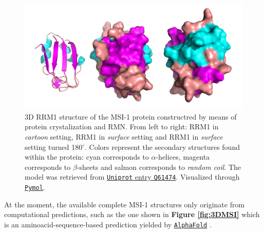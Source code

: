 \begin{figure}[htbp!]
    \centering
    \includegraphics[width=0.9\linewidth]{assets/RRM1_various.png}
    \caption[3D RRM1 structure of the MSI-1 protein constructred by means of protein crystalization and RMN.]{3D RRM1 structure of the MSI-1 protein constructred by means of protein crystalization and RMN. From left to right: RRM1 in \textit{cartoon} setting, RRM1 in \textit{surface} setting and RRM1 in \textit{surface} setting turned 180$^\circ$. Colors represent the secondary structures found within the protein: cyan corresponds to $\alpha$-helices, magenta corresponds to $\beta$-sheets and salmon corresponds to \textit{random coil}. The model was retrieved from \href{https://www.uniprot.org/uniprotkb/Q61474/entry}{\texttt{Uniprot} entry \texttt{Q61474}}. Visualized through \href{https://pymol.org/2/}{\texttt{Pymol}}.}
    \label{fig:3DRRM1}
\end{figure}

\pagebreak

At the moment, the available complete MSI-1 structures only originate from computational predictions, such as the one shown in \textbf{Figure \ref{fig:3DMSI}} which is an aminoacid-sequence-based prediction yielded by \href{https://alphafold.ebi.ac.uk/}{\texttt{AlphaFold}} \cite{jumper_2021}.


